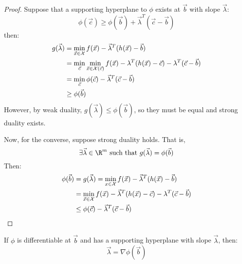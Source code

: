 \documentclass[../Main.tex]{subfiles}
\begin{document}
\begin{proof}
    Suppose that a supporting hyperplane to $\phi$ exists at $\vec{b}$ with slope $\vec{\lambda}$:
    \begin{equation*}
        \phi(\vec{c}) \geq \phi(\vec{b}) + \vec{\lambda}^T (\vec{c} - \vec{b})
    \end{equation*}
    then:
    \begin{align*}
        g(\vec{\lambda}) &= \min_{\vec{x} \in \mathcal{X}} f(\vec{x}) - \vec{\lambda}^T (h(\vec{x}) - \vec{b}) \\
        &= \min_{\vec{c}} \min_{\vec{x} \in \mathcal{X}(\vec{c})} f(\vec{x}) - \lambda^T (h(\vec{x}) - \vec{c}) - \lambda^T (\vec{c} - \vec{b}) \\
        &= \min_{\vec{c}} \phi(\vec{c}) - \vec{\lambda}^T (\vec{c} - \vec{b}) \\
        &\geq \phi(\vec{b})
    \end{align*}
    However, by weak duality, $g(\vec{\lambda}) \leq \phi(\vec{b})$, so they must be equal and strong duality exists.

    Now, for the converse, suppose strong duality holds. That is,
    \begin{equation*}
        \exists \vec{\lambda} \in \R^m \text{ such that } g(\vec{\lambda}) = \phi(\vec{b})
    \end{equation*}
    Then:
    \begin{align*}
        \phi(\vec{b}) &= g(\vec{\lambda}) = \min_{x \in \mathcal{X}} f(\vec{x}) - \vec{\lambda}^T (h(\vec{x}) - \vec{b}) \\
        &= \min_{\vec{x} \in \mathcal{X}} f(\vec{x}) - \vec{\lambda}^T (h(\vec{x}) - \vec{c}) - \lambda^T (\vec{c} - \vec{b}) \\
        &\leq \phi(\vec{c}) - \vec{\lambda}^T (\vec{c} - \vec{b})
    \end{align*}
\end{proof}
\begin{example}
\end{example}
\begin{theorem}
    If $\phi$ is differentiable at $\vec{b}$ and has a supporting hyperplane with slope $\vec{\lambda}$, then:
    \begin{equation*}
        \vec{\lambda} = \nabla \phi(\vec{b})
    \end{equation*}
\end{theorem}
\end{document}
